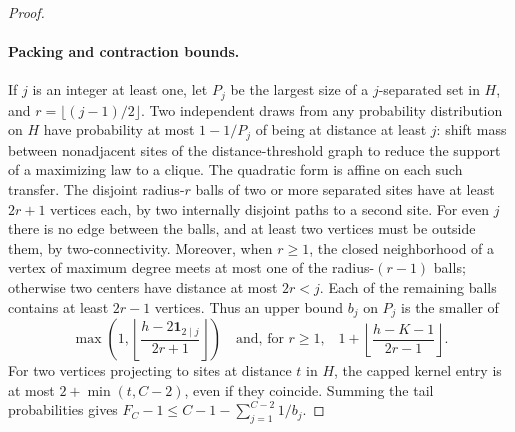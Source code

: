 \documentclass[11pt,a4paper]{article}
\begin{document}
\begin{proof}
\paragraph{Packing and contraction bounds.}
If $j$ is an integer at least one, let $P_j$ be the largest size of a
$j$-separated set in $H$, and $r=\lfloor(j-1)/2\rfloor$. Two independent draws
from any probability distribution on $H$ have probability at most
$1-1/P_j$ of being at distance at least $j$: shift mass between nonadjacent
sites of the distance-threshold graph to reduce the support of a maximizing
law to a clique. The quadratic form is affine on each such transfer.
The disjoint radius-$r$ balls of two or more separated sites have at
least $2r+1$ vertices each, by two internally disjoint paths to a second site.
For even $j$ there is no edge between the balls, and at least two vertices
must be outside them, by two-connectivity. Moreover, when $r\ge1$, the
closed neighborhood of a vertex of maximum degree meets at most one
of the radius-$(r-1)$ balls; otherwise two centers have distance at most
$2r<j$. Each of the remaining balls contains at least $2r-1$ vertices.
Thus an upper bound $b_j$ on $P_j$ is the smaller of
\[
 \max\left(1,\left\lfloor\frac{h-2\mathbf1_{2\mid j}}{2r+1}\right\rfloor\right)
 \quad\text{and, for $r\ge1$,}\quad
 1+\left\lfloor\frac{h-K-1}{2r-1}\right\rfloor .
\]
For two vertices projecting to sites at distance $t$ in $H$, the capped
kernel entry is at most $2+\min(t,C-2)$, even if they coincide. Summing the
tail probabilities gives $F_C-1\le C-1-\sum_{j=1}^{C-2}1/b_j$.


\end{proof}
\end{document}
